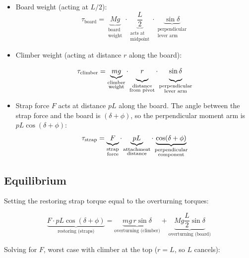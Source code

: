 \documentclass[12pt]{article}
\begin{document}
\begin{itemize}
    \item Board weight (acting at $L/2$):
    \[
    \tau_{\text{board}} =
    \underbrace{Mg}_{\substack{\text{board}\\\text{weight}}}
    \cdot
    \underbrace{\frac{L}{2}}_{\substack{\text{acts at}\\\text{midpoint}}}
    \cdot
    \underbrace{\sin\delta}_{\substack{\text{perpendicular}\\\text{lever arm}}}
    \]

    \item Climber weight (acting at distance $r$ along the board):
    \[
    \tau_{\text{climber}} =
    \underbrace{mg}_{\substack{\text{climber}\\\text{weight}}}
    \cdot
    \underbrace{r\vphantom{\frac{L}{2}}}_{\substack{\text{distance}\\\text{from pivot}}}
    \cdot
    \underbrace{\sin\delta\vphantom{\frac{L}{2}}}_{\substack{\text{perpendicular}\\\text{lever arm}}}
    \]

    \item Strap force $F$ acts at distance $pL$ along the board. The angle between the strap force and the board is $(\delta + \phi)$, so the perpendicular moment arm is $pL \cos(\delta + \phi)$:
    \[
    \tau_{\text{strap}} =
    \underbrace{F\vphantom{pL}}_{\substack{\text{strap}\\\text{force}}}
    \cdot
    \underbrace{pL}_{\substack{\text{attachment}\\\text{distance}}}
    \cdot
    \underbrace{\cos(\delta + \phi)}_{\substack{\text{perpendicular}\\\text{component}}}
    \]
\end{itemize}

\subsection{Equilibrium}

Setting the restoring strap torque equal to the overturning torques:

\[
\underbrace{F \cdot pL \cos(\delta+\phi)}_{\text{restoring (straps)}}
=
\underbrace{mg \, r \sin\delta}_{\text{overturning (climber)}}
+
\underbrace{Mg \frac{L}{2} \sin\delta}_{\text{overturning (board)}}
\]

Solving for $F$, worst case with climber at the top ($r = L$, so $L$ cancels):
\end{document}
